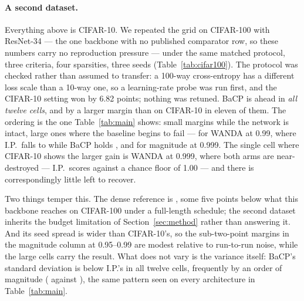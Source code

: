 \paragraph{A second dataset.}
Everything above is CIFAR-10. We repeated the grid on CIFAR-100 with
ResNet-34 --- the one backbone with no published comparator row, so these
numbers carry no reproduction pressure --- under the same matched protocol,
three criteria, four sparsities, three seeds (Table~\ref{tab:cifar100}). The
protocol was checked rather than assumed to transfer: a 100-way
cross-entropy has a different loss scale than a 10-way one, so a
learning-rate probe was run first, and the CIFAR-10 setting won by
\num{6.82} points; nothing was retuned. BaCP is ahead in \emph{all twelve
cells}, and by a larger margin than on CIFAR-10 in eleven of them. The
ordering is the one Table~\ref{tab:main} shows: small margins while the
network is intact, large ones where the baseline begins to fail ---
 for WANDA at 0.99, where I.P.\ falls to
 while BaCP holds
, and  for
magnitude at 0.999. The single cell where CIFAR-10 shows the larger gain is
WANDA at 0.999, where both arms are near-destroyed --- I.P.\ scores
 against a chance floor of \num{1.00} --- and
there is correspondingly little left to recover.

Two things temper this. The dense reference is
, some five points below what this backbone reaches on
CIFAR-100 under a full-length schedule; the second dataset inherits the
budget limitation of Section~\ref{sec:method} rather than answering it. And
its seed spread is wider than CIFAR-10's, so the sub-two-point margins in the
magnitude column at 0.95--0.99 are modest relative to run-to-run noise, while
the large cells carry the result. What does not vary is the variance itself:
BaCP's standard deviation is below I.P.'s in all twelve cells, frequently by
an order of magnitude ( against
), the same pattern seen on every architecture in
Table~\ref{tab:main}.

